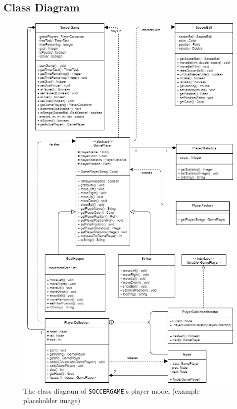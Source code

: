 \documentclass[12pt, dvipsnames, a4paper]{article}
\newcommand{\code}[1]{\texttt{#1}}
\begin{document}
\subsection{Class Diagram}
\begin{center}
	\begin{figure}[H]
		\hspace{30pt}
		\includegraphics[scale=.7]{diagrams/class-diagrams/soccer-model/soccer-model-cd.png}
		\caption{The class diagram of \code{SOCCERGAME}'s player model (example placeholder image)}
		\label{fig:backend}
	\end{figure}
\end{center}
\clearpage
\end{document}
